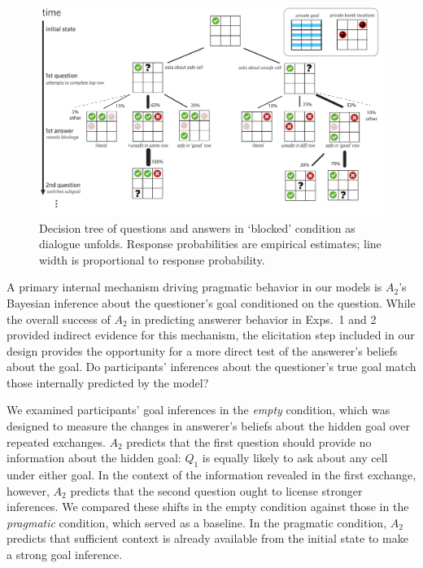 \documentclass[11pt, floatsintext]{apa6}
\begin{document}
\begin{figure}[t!]
\begin{center}
\includegraphics[scale = .6]{Exp3/blocked.pdf}
\end{center}
\caption{Decision tree of questions and answers in `blocked' condition as dialogue unfolds. Response probabilities are empirical estimates; line width is proportional to response probability.}
\label{fig:blocked}
\end{figure}


A primary internal mechanism driving pragmatic behavior in our models is $A_2$'s Bayesian inference about the questioner's goal conditioned on the question. 
While the overall success of $A_2$ in predicting answerer behavior in Exps.~1 and 2 provided indirect evidence for this mechanism, the elicitation step included in our design provides the opportunity for a more direct test of the answerer's beliefs about the goal.
Do participants' inferences about the questioner's true goal match those internally predicted by the model?

We examined participants' goal inferences in the \emph{empty} condition, which was designed to measure the changes in answerer's beliefs about the hidden goal over repeated exchanges. 
$A_2$ predicts that the first question should provide no information about the hidden goal: $Q_1$ is equally likely to ask about any cell under either goal.
In the context of the information revealed in the first exchange, however, $A_2$ predicts that the second question ought to license stronger inferences.
We compared these shifts in the empty condition against those in the \emph{pragmatic} condition, which served as a baseline.
In the pragmatic condition, $A_2$ predicts that sufficient context is already available from the initial state to make a strong goal inference.
\end{document}
